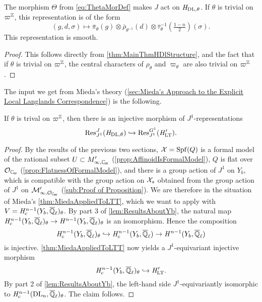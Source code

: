 \documentclass[../main.tex]{subfiles}
\begin{document}
\begin{lem}
  The morphism $\Theta$ from \eqref{eq:ThetaMorDef} makes $J$ act on
  ${\mathit H}_{\mathrm{DL},\theta}$. If $\theta$ is trivial on $\varpi^{\mathbb{Z}}$, this
  representation is of the form 
  \begin{equation*}
    (g,d,\sigma) \mapsto \bar \pi_\theta(g) \otimes \bar \rho_{\theta^{-1}}(d)
    \otimes \bar \tau_\theta^{-1}(\tfrac{1-n}2)(\sigma).
  \end{equation*}
  This representation is smooth.
\begin{proof}
  This follows directly from \cref{thm:MainThmHDlStructure}, and the fact that 
  if $\theta$ is trivial on $\varpi^{\mathbb{Z}}$, the central characters of $\rho_\theta$
  and $\varpi_\theta$ are also trivial on $\varpi^{\mathbb{Z}}$. 
\end{proof}
\end{lem}

The input we get from Mieda's theory (\cref{sec:Mieda's Approach
to the Explicit Local Langlands Correspondence}) is the
following.
\begin{prop}\label{prop:J1EquivInjMor}
  If $\theta$ is trival on $\varpi^{\mathbb{Z}}$, then there is an injective morphism of
  $J^1$-represen\allowbreak{}tations
  \begin{equation*} 
    \operatorname{Res}_{J^1}^J( \mathit H_{\mathrm{DL},\theta} ) \hookrightarrow \operatorname{Res}_{J^1}^{G^1}( \mathit H'_{\mathrm{LT}}).
  \end{equation*}
  \begin{proof}
    By the results of the previous two sections, $\mathcal{X} = \operatorname{Spf}(Q)$ is a formal
    model of the rational subset $U \subset M'_{\infty, \Cp}$
    (\cref{prop:AffinoidIsFormalModel}), 
    $Q$ is flat over $\cO_\Cp$ (\cref{prop:FlatnessOfFormalModel}),
    and there is a group action of $J^1$ on $Y_b$, which is compatible with the group
    action on $\mathcal{X}_s$ obtained from the group action of $J^1$ on $\cM_{\infty,
    \cO_\Cp}'$ (\cref{sub:Proof of Proposition}).
    We are therefore in the situation of Mieda's \cref{thm:MiedaAppliedToLTT}, which we want to apply with $V = \mathit H^{n-1}_c(Y_b, {\overline {\mathbb{Q}}_\ell})_\theta$. 
    By part 3 of \cref{lem:ResultsAboutYb}, 
    the natural map $\mathit H_c^{n-1}(Y_b, {\overline {\mathbb{Q}}_\ell})_\theta \to \mathit H^{n-1}(Y_b,
    {\overline {\mathbb{Q}}_\ell})_\theta$ is an isomorphism. Hence the composition
    \begin{equation*}
      \mathit H^{n-1}_c(Y_b, {\overline {\mathbb{Q}}_\ell})_\theta \hookrightarrow \mathit H^{n-1}_c(Y_b, {\overline {\mathbb{Q}}_\ell})
      \to \mathit H^{n-1}(Y_b, {\overline {\mathbb{Q}}_\ell})
    \end{equation*}
    is injective. 
    \cref{thm:MiedaAppliedToLTT} now yields a $J^1$-equivariant injective morphism
    \begin{equation*}
      \mathit H_c^{n-1}(Y_b, {\overline {\mathbb{Q}}_\ell})_\theta \hookrightarrow \mathit H'_{\mathrm{LT}}.
    \end{equation*}
    By part 2 of \cref{lem:ResultsAboutYb}, the left-hand side $J^1$-equivariantly isomorphic to $\mathit H_c^{n-1}(\mathrm{DL}_n, {\overline {\mathbb{Q}}_\ell})_\theta$. The
    claim follows.
  \end{proof}
\end{prop}
\end{document}

